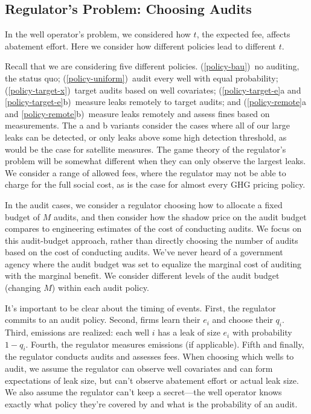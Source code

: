 \documentclass[12pt,oneside,letterpaper]{article}
\theoremstyle{definition}
\begin{document}
\begin{refsection}
\subsection{Regulator's Problem: Choosing Audits}
\label{sec:regulator-problem-choosing-audits}


In the well operator's problem, we considered how \(t\), the expected fee, affects abatement effort.
Here we consider how different policies lead to different \(t\).

Recall that we are considering five different policies.
(\ref{policy-bau})~no auditing, the status quo;
(\ref{policy-uniform})~audit every well with equal probability;
(\ref{policy-target-x})~target audits based on well covariates;
(\ref{policy-target-e}a and \ref{policy-target-e}b)~measure leaks remotely to target audits; and
(\ref{policy-remote}a and \ref{policy-remote}b)~measure leaks remotely and assess fines based on measurements.
The a and b variants consider the cases where all of our large leaks can be detected, or only leaks above some high detection threshold, as would be the case for satellite measures.
The game theory of the regulator's problem will be somewhat different when they can only observe the largest leaks.
We consider a range of allowed fees, where the regulator may not be able to charge for the full social cost, as is the case for almost every \gls{GHG} pricing policy.

In the audit cases, we consider a regulator choosing how to allocate a fixed budget of \(M\) audits, and then consider how the shadow price on the audit budget compares to engineering estimates of the cost of conducting audits.
We focus on this audit-budget approach, rather than directly choosing the number of audits based on the cost of conducting audits.
We've never heard of a government agency where the audit budget was set to equalize the marginal cost of auditing with the marginal benefit.
We consider different levels of the audit budget (changing \(M\)) within each audit policy.

It's important to be clear about the timing of events.
First, the regulator commits to an audit policy.
Second, firms learn their \(e_i\) and choose their \(q_i\).
Third, emissions are realized: each well \(i\) has a leak of size \(e_i\) with probability \(1 - q_i\).
Fourth, the regulator measures emissions (if applicable).
Fifth and finally, the regulator conducts audits and assesses fees.
When choosing which wells to audit, we assume the regulator can observe well covariates and can form expectations of leak size, but can't observe abatement effort or actual leak size.
We also assume the regulator can't keep a secret---the well operator knows exactly what policy they're covered by and what is the probability of an audit.


\end{refsection}
\end{document}
